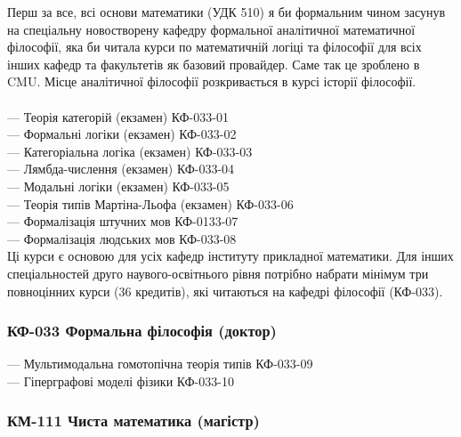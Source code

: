 Перш за все, всі основи математики (УДК 510) я би формальним чином
засунув на спеціальну новостворену кафедру формальної аналітичної
математичної філософії, яка би читала курси по математичній логіці
та філософії для всіх інших кафедр та факультетів як базовий провайдер.
Саме так це зроблено в CMU. Місце аналітичної філософії розкривається
в курсі історії філософії.
\\
\\
\noindent--- Теорія категорій (екзамен) КФ-033-01\\
--- Формальні логіки (екзамен) КФ-033-02\\
--- Категоріальна логіка (екзамен) КФ-033-03\\
--- Лямбда-числення (екзамен) КФ-033-04\\
--- Модальні логіки (екзамен) КФ-033-05\\
--- Теорія типів Мартіна-Льофа (екзамен) КФ-033-06\\
--- Формалізація штучних мов КФ-0133-07\\
--- Формалізація людських мов КФ-033-08\\

Ці курси є основою для усіх кафедр інституту прикладної математики.
Для інших спеціальностей друго наувого-освітнього рівня потрібно
набрати мінімум три повноцінних курси (36 кредитів), які читаються
на кафедрі філософії (КФ-033).

\subsubsection*{КФ-033 Формальна філософія (доктор)}

\noindent--- Мультимодальна гомотопічна теорія типів КФ-033-09\\
--- Гіперграфові моделі фізики КФ-033-10\\

\subsubsection*{КМ-111 Чиста математика (магістр)}

